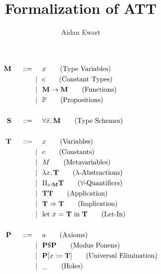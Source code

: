 \documentclass{article}
\author{Aidan Ewart}
\title{Formalization of ATT}
\newcommand{\prop}{\mathbb{P}}
\newcommand{\bnfdef}{\hspace{0.5cm} ::= \hspace{0.5cm}}
\newcommand{\alt}{\hspace{0.25cm} | \hspace{0.25cm}}
\newcommand{\bb}{\mathbf}
\begin{document}
\begin{align*}
    \bb{M} \bnfdef&
        x
        \tag{Type Variables}
    \\\alt&
        c
        \tag{Constant Types}
    \\\alt&
        \bb{M} \to \bb{M}
        \tag{Functions}
    \\\alt&
        \prop
        \tag{Propositions}
    \\\\\bb{S} \bnfdef&
        \forall{\bar{x}}, \bb{M}
        \tag{Type Schemes}
    \\\\\bb{T} \bnfdef&
        x
        \tag{Variables}
    \\\alt&
        c
        \tag{Constants}
    \\\alt&
        M
        \tag{Metavariables}
    \\\alt&
        \lambda x, \bb{T}
        \tag{$\lambda$-Abstractions}
    \\\alt&
        \Pi_{x : \bb{M}} \bb{T}
        \tag{$\forall$-Quantifiers}
    \\\alt&
        \bb{T} \bb{T}
        \tag{Application}
    \\\alt&
        \bb{T} \Rightarrow \bb{T}
        \tag{Implication}
    \\\alt&
        \text{let $x$ = $\bb{T}$ in $\bb{T}$}
        \tag{Let-In}
    \\\\\bb{P} \bnfdef&
        a
        \tag{Axioms}
    \\\alt&
        \bb{P} \$ \bb{P}
        \tag{Modus Ponens}
    \\\alt&
        \bb{P}[x := \bb{T}]
        \tag{Universal Elimination}
    \\\alt&
        \_
        \tag{Holes}
\end{align*}

\end{document}
